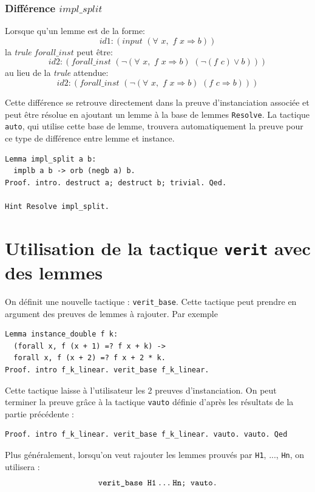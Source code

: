 \documentclass[11pt]{article}
\begin{document}
\subsubsection{Différence $impl\_split$}

Lorsque qu'un lemme est de la forme:
\[ id1:(input \,\,(\forall\,\, x,\,\, f \,\,x \Rightarrow b)) \]
la \textit{trule} $forall\_inst$ peut être:
\[ id2:(forall\_inst \,\, ( \neg (\forall\,\, x, \,\,f \,\, x \Rightarrow b) \,\,(\neg (f\,\, c) \vee  b))) \]
au lieu de la \textit{trule} attendue:
\[ id2:(forall\_inst  \,\,( \neg (\forall \,\,x,\,\, f\,\, x \Rightarrow b)\,\, (f \,\,c \Rightarrow b))) \]

Cette différence se retrouve directement dans la preuve d'instanciation associée et peut être résolue en ajoutant un lemme à la base de lemmes \texttt{Resolve}. La tactique \texttt{auto}, qui utilise cette base de lemme, trouvera automatiquement la preuve pour ce type de différence entre lemme et instance.

\begin{lstlisting}[frame=single]
Lemma impl_split a b:
  implb a b -> orb (negb a) b.
Proof. intro. destruct a; destruct b; trivial. Qed.

Hint Resolve impl_split.
\end{lstlisting}



\section{Utilisation de la tactique \texttt{verit} avec des lemmes}

On définit une nouvelle tactique : \texttt{verit\_base}. Cette tactique peut prendre en argument des preuves de lemmes à rajouter. Par exemple 
\begin{lstlisting}[frame=single]
Lemma instance_double f k:
  (forall x, f (x + 1) =? f x + k) ->
  forall x, f (x + 2) =? f x + 2 * k.
Proof. intro f_k_linear. verit_base f_k_linear.
\end{lstlisting}
Cette tactique laisse à l'utilisateur les 2 preuves d'instanciation. On peut terminer la preuve grâce à la tactique \texttt{vauto} définie d'après les résultats de la partie précédente : 
\begin{lstlisting}[frame=single]
Proof. intro f_k_linear. verit_base f_k_linear. vauto. vauto. Qed
\end{lstlisting}
Plus généralement, lorsqu'on veut rajouter les lemmes prouvés par \texttt{H1}, ..., \texttt{Hn}, on utilisera : 
\[\texttt{verit\_base H1\,...\,Hn; vauto.}\]
\end{document}

